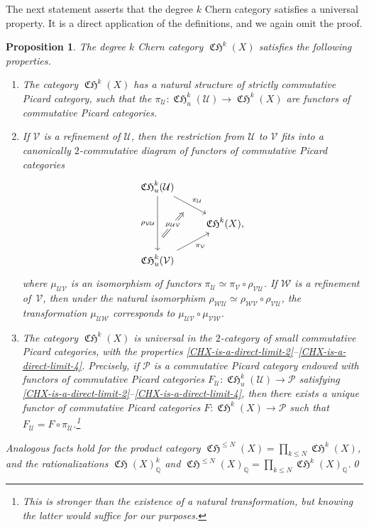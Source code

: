 \documentclass[11pt]{article}
\theoremstyle{plain}
\newtheorem{proposition}[theorem]{Proposition}
\theoremstyle{definition}
\newcommand{\QBbb}{\mathbb Q}
\newcommand{\Pcal}{\mathcal P}
\newcommand{\Ucal}{\mathcal U}
\newcommand{\Vcal}{\mathcal V}
\newcommand{\Wcal}{\mathcal W}
\DeclareMathOperator{\CHfrak}{\mathfrak{CH}}
\begin{document}
The next statement asserts that the degree $k$ Chern category satisfies a universal property. It is a direct application of the definitions, and we again omit the proof.
\begin{proposition}\label{prop:CHX-is-a-direct-limit}
The degree $k$ Chern category $\CHfrak^{k}(X)$ satisfies the following properties.
\begin{enumerate}
\item\label{CHX-is-a-direct-limit-2} The category $\CHfrak^{k}(X)$ has a natural structure of strictly commutative Picard category, such that the $\pi_{\Ucal}\colon\CHfrak_{u}^{k}(\Ucal)\to\CHfrak^{k}(X)$ are functors of commutative Picard categories.

\item\label{CHX-is-a-direct-limit-4} If $\Vcal$ is a refinement of $\Ucal$, then the restriction from $\Ucal$ to $\Vcal$ fits into a canonically $2$-commutative diagram of functors of commutative Picard categories
\begin{displaymath}
\begin{tikzcd}
\CHfrak_{u}^{k}(\Ucal) \ar[rd, "\pi_{\Ucal}"] \ar[rd, phantom, shift right = 0.2ex, ""{name=PIU}] \ar["\rho_{\Vcal\Ucal}"', dd] \ar[dd, phantom, shift right = 0.2ex, ""{name=PVU}, very near end] & \\
& \CHfrak^{k}(X), \\
\CHfrak_{u}^{k}(\Vcal) \ar[ru, "\pi_{\Vcal}"' ] \arrow[Rightarrow, from = PVU, to = PIU, "\mu_{\Ucal \Vcal}" description, shorten=2mm]
\end{tikzcd}
\end{displaymath}
where $\mu_{\Ucal\Vcal}$ is an isomorphism of functors $\pi_{\Ucal}\simeq\pi_{\Vcal}\circ\rho_{\Vcal\Ucal}$. If $\Wcal$ is a refinement of~$\Vcal$, then under the natural isomorphism $\rho_{\Wcal\Ucal}\simeq \rho_{\Wcal\Vcal}\circ\rho_{\Vcal\Ucal}$, the transformation $\mu_{\Ucal\Wcal}$ corresponds to $\mu_{\Ucal\Vcal}\circ\mu_{\Vcal\Wcal}$.
\item\label{CHX-is-a-direct-limit-5} The category $\CHfrak^{k}(X)$ is universal in the $2$-category of small commutative \hbox{Picard} categories, with the properties \eqref{CHX-is-a-direct-limit-2}--\eqref{CHX-is-a-direct-limit-4}. Precisely, if $\Pcal$ is a commutative Picard category endowed with functors of commutative Picard categories $F_{\Ucal}\colon\CHfrak_{u}^{k}(\Ucal)\to\Pcal$ satisfying \eqref{CHX-is-a-direct-limit-2}--\eqref{CHX-is-a-direct-limit-4}, then there exists a unique functor of commutative Picard categories $F\colon\CHfrak^{k}(X)\to\Pcal$ such that $F_{\Ucal}=F\circ\pi_{\Ucal}$.\footnote{This is stronger than the existence of a natural transformation, but knowing the latter would suffice for our purposes.}
\end{enumerate}
Analogous facts hold for the product category $\CHfrak^{\leq N}(X)=\prod_{k\leq N}\CHfrak^{k}(X)$, and the rationalizations $\CHfrak(X)_{\QBbb}^{k}$ and $\CHfrak^{\leq N}(X)_{\QBbb}=\prod_{k\leq N}\CHfrak^{k}(X)_{\QBbb}$.\qed
\end{proposition}
\end{document}
